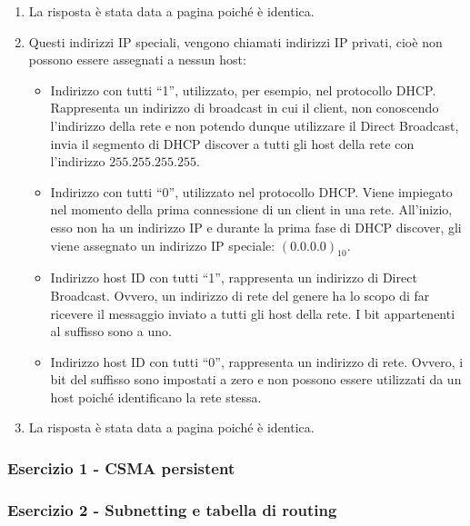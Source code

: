 \documentclass[a4paper]{article}
\newcommand{\dquotes}[1]{``#1''}
\begin{document}
	\begin{enumerate}
		\item La risposta è stata data a pagina \pageref{ARP} poiché è identica.
		
		\item Questi indirizzi IP speciali, vengono chiamati indirizzi IP privati, cioè non possono essere assegnati a nessun host:
		\begin{itemize}
			\item Indirizzo con tutti \dquotes{1}, utilizzato, per esempio, nel protocollo DHCP. Rappresenta un indirizzo di broadcast in cui il client, non conoscendo l'indirizzo della rete e non potendo dunque utilizzare il Direct Broadcast, invia il segmento di DHCP discover a tutti gli host della rete con l'indirizzo $255.255.255.255$.
			
			\item Indirizzo con tutti \dquotes{0}, utilizzato nel protocollo DHCP. Viene impiegato nel momento della prima connessione di un client in una rete. All'inizio, esso non ha un indirizzo IP e durante la prima fase di DHCP discover, gli viene assegnato un indirizzo IP speciale: $\left(0.0.0.0\right)_{10}$.
			
			\item Indirizzo host ID con tutti \dquotes{1}, rappresenta un indirizzo di Direct Broadcast. Ovvero, un indirizzo di rete del genere ha lo scopo di far ricevere il messaggio inviato a tutti gli host della rete. I bit appartenenti al suffisso sono a uno.
			
			\item Indirizzo host ID con tutti \dquotes{0}, rappresenta un indirizzo di rete. Ovvero, i bit del suffisso sono impostati a zero e non possono essere utilizzati da un host poiché identificano la rete stessa.
		\end{itemize}
		
		\item La risposta è stata data a pagina \pageref{Well-Known Ports} poiché è identica.
	\end{enumerate}
	
	\subsubsection{Esercizio 1 - CSMA persistent}
	
	\subsubsection{Esercizio 2 - Subnetting e tabella di routing}
	
\end{document}
